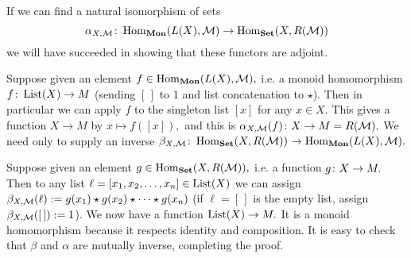 \documentclass[../main/CT4S-EN-RU]{subfiles}
\begin{document}
\begin{propositionRUS}\label{prop:free forgetful monoid}
\end{propositionRUS}

\begin{proofENG}
If we can find a natural isomorphism of sets 
$$\alpha_{X,\mathcal{M}}\colon\operatorname{Hom}_{\mathbf{Mon}}(L(X),\mathcal{M})\rightarrow\operatorname{Hom}_{\mathbf{Set}}(X,R(\mathcal{M}))$$
we will have succeeded in showing that these functors are adjoint.

Suppose given an element $f\in\operatorname{Hom}_{\mathbf{Mon}}(L(X),\mathcal{M}),$ i.e. a monoid homomorphism $f\colon\operatorname{List}(X)\rightarrow M$ (sending $[\,]$ to $1$ and list concatenation to $\star$). Then in particular we can apply $f$ to the singleton list $[x]$ for any $x\in X.$ This gives a function $X\to M$ by $x\mapsto f([x]),$ and this is $\alpha_{X,\mathcal{M}}(f)\colon X\rightarrow M=R(\mathcal{M}).$ We need only to supply an inverse $\beta_{X,\mathcal{M}}\colon\operatorname{Hom}_{\mathbf{Set}}(X,R(\mathcal{M}))\rightarrow\operatorname{Hom}_{\mathbf{Mon}}(L(X),\mathcal{M}).$

Suppose given an element $g\in\operatorname{Hom}_{\mathbf{Set}}(X,R(\mathcal{M})),$ i.e. a function $g\colon X\rightarrow M.$ Then to any list $\ell=[x_1,x_2,\ldots,x_n]\in\operatorname{List}(X)$ we can assign $\beta_{X,\mathcal{M}}(\ell):=g(x_1)\star g(x_2)\star\cdots\star g(x_n)$ (if $\ell=[\,]$ is the empty list, assign $\beta_{X,\mathcal{M}}([\,]):=1$). We now have a function $\operatorname{List}(X)\rightarrow M.$ It is a monoid homomorphism because it respects identity and composition. It is easy to check that $\beta$ and $\alpha$ are mutually inverse, completing the proof.
\end{proofENG}

\begin{proofRUS}
\end{proofRUS}
\end{document}
